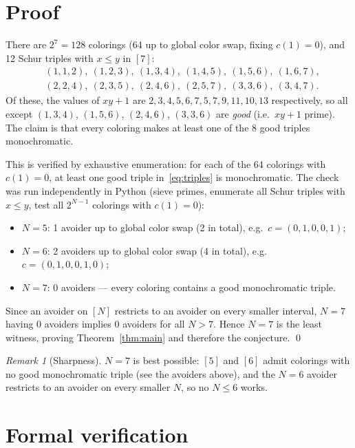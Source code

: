\documentclass[11pt]{article}
\theoremstyle{plain}
\theoremstyle{definition}
\theoremstyle{remark}
\newtheorem{remark}[theorem]{Remark}
\begin{document}
\section{Proof}

There are $2^7=128$ colorings (64 up to global color swap, fixing $c(1)=0$),
and 12 Schur triples with $x\le y$ in $[7]$:
\begin{equation}\label{eq:triples}
\begin{aligned}
&(1,1,2),\ (1,2,3),\ (1,3,4),\ (1,4,5),\ (1,5,6),\ (1,6,7),\\
&(2,2,4),\ (2,3,5),\ (2,4,6),\ (2,5,7),\ (3,3,6),\ (3,4,7).
\end{aligned}
\end{equation}
Of these, the values of $xy+1$ are
$2,3,4,5,6,7,5,7,9,11,10,13$ respectively, so all except
$(1,3,4)$, $(1,5,6)$, $(2,4,6)$, $(3,3,6)$ are \emph{good} (i.e.\ $xy+1$
prime). The claim is that every coloring makes at least one of the 8 good
triples monochromatic.

This is verified by exhaustive enumeration: for each of the 64 colorings with
$c(1)=0$, at least one good triple in~\eqref{eq:triples} is monochromatic.
The check was run independently in Python (sieve primes, enumerate all Schur
triples with $x\le y$, test all $2^{N-1}$ colorings with $c(1)=0$):
\begin{itemize}
  \item $N=5$: 1 avoider up to global color swap (2 in total),
    e.g.\ $c=(0,1,0,0,1)$;
  \item $N=6$: 2 avoiders up to global color swap (4 in total),
    e.g.\ $c=(0,1,0,0,1,0)$;
  \item $N=7$: 0 avoiders --- every coloring contains a good monochromatic
    triple.
\end{itemize}
Since an avoider on $[N]$ restricts to an avoider on every smaller interval,
$N=7$ having 0 avoiders implies 0 avoiders for all $N>7$.
Hence $N=7$ is the least witness, proving Theorem~\ref{thm:main} and therefore
the conjecture. \qed

\begin{remark}[Sharpness]
$N=7$ is best possible: $[5]$ and $[6]$ admit colorings with no good
monochromatic triple (see the avoiders above), and the $N=6$ avoider restricts
to an avoider on every smaller $N$, so no $N\le6$ works.
\end{remark}

\section{Formal verification}
\end{document}
